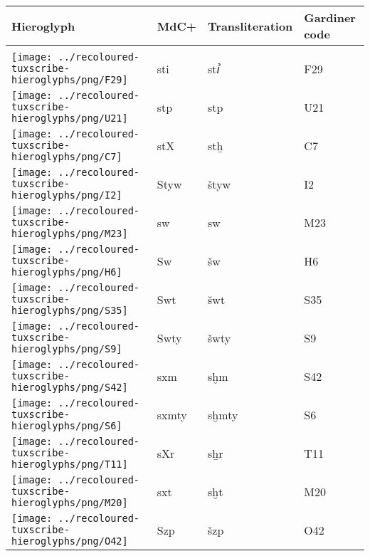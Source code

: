 \begin{center}
	\begin{tabularx}{\linewidth}{YYYY}
		Hieroglyph & MdC+ & Transliteration & Gardiner code\\
		\hline\\
		\texttt{[image: ../recoloured-tuxscribe-hieroglyphs/png/F29]} & sti & stꞽ & F29 \\ 
		\texttt{[image: ../recoloured-tuxscribe-hieroglyphs/png/U21]} & stp & stp & U21 \\ 
		\texttt{[image: ../recoloured-tuxscribe-hieroglyphs/png/C7]} & stX & stẖ & C7 \\ 
		\texttt{[image: ../recoloured-tuxscribe-hieroglyphs/png/I2]} & Styw & štyw & I2 \\ 
		\texttt{[image: ../recoloured-tuxscribe-hieroglyphs/png/M23]} & sw & sw & M23 \\ 
		\texttt{[image: ../recoloured-tuxscribe-hieroglyphs/png/H6]} & Sw & šw & H6 \\ 
		\texttt{[image: ../recoloured-tuxscribe-hieroglyphs/png/S35]} & Swt & šwt & S35 \\ 
		\texttt{[image: ../recoloured-tuxscribe-hieroglyphs/png/S9]} & Swty & šwty & S9 \\ 
		\texttt{[image: ../recoloured-tuxscribe-hieroglyphs/png/S42]} & sxm & sḫm & S42 \\ 
		\texttt{[image: ../recoloured-tuxscribe-hieroglyphs/png/S6]} & sxmty & sḫmty & S6 \\ 
		\texttt{[image: ../recoloured-tuxscribe-hieroglyphs/png/T11]} & sXr & sẖr & T11 \\ 
		\texttt{[image: ../recoloured-tuxscribe-hieroglyphs/png/M20]} & sxt & sḫt & M20 \\ 
		\texttt{[image: ../recoloured-tuxscribe-hieroglyphs/png/O42]} & Szp & šzp & O42 \\ 
	\end{tabularx}
\end{center}


